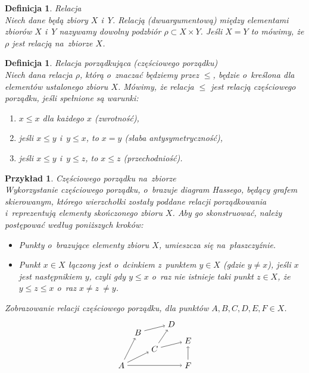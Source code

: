 \documentclass[12pt,a4paper]{report}
\newtheorem{definition}[theorem]{Definicja}
\newtheorem{example}{Przykład}
\begin{document}
\begin{definition}{Relacja \cite[Rozdział 3]{kuratowski2004}}\\
Niech dane będą zbiory $X$ i~$Y$. Relacją (dwuargumentową) między elementami zbiorów $X$ i~$Y$ nazywamy dowolny podzbiór $\rho \subset X \times Y $. Jeśli $X=Y$ to mówimy, że $\rho$ jest relacją na~zbiorze $X$. 
\end{definition} 


\begin{definition}{Relacja porządkująca (częściowego porządku) \cite[Rozdział 2]{blaszczyk2007}}\label{def-relacja-czesciowego-porzadku}\\
Niech dana relacja $\rho$, którą o~znaczać będziemy przez $\leq$, będzie o~kreślona dla elementów ustalonego zbioru $X$. Mówimy, że relacja $\leq$ jest relacją częściowego porządku, jeśli spełnione są warunki:
\begin{enumerate}
\item $x \leq x$ dla każdego $x$ (zwrotność),
\item jeśli $x \leq y$ i~$y \leq x$, to $x=y$ (słaba antysymetryczność),
\item jeśli $x \leq y$ i~$y \leq z$, to $x \leq z$ (przechodniość).
\end{enumerate}
\end{definition}


\begin{example}{Częściowego porządku na~zbiorze}\label{przyklad-czesciowy-porzadek}\\
Wykorzystanie częściowego porządku, o~brazuje diagram Hassego, będący grafem skierowanym, którego wierzchołki zostały poddane relacji porządkowania i~reprezentują elementy  skończonego zbioru $X$. 
Aby go skonstruować, należy postępować według poniższych kroków:
\begin{itemize}
\item Punkty o~brazujące elementy zbioru $X$, umieszcza się na~płaszczyźnie.
\item Punkt $x\in X$ łączony jest o~dcinkiem z~punktem $y \in X$ (gdzie $y\neq x$), jeśli $x$ jest następnikiem $y$, czyli gdy $y \leq x$ o~raz nie istnieje taki punkt $z \in X$, że $y\leq z\leq x$ o~raz $x\neq z~\neq y$.
\end{itemize}
Zobrazowanie relacji częściowego porządku, dla punktów $A, B, C, D, E, F \in X$.
$$
\begin{tikzpicture}[scale=.7]
  \node (A) at (-1,0) {$A$};
  \node (B) at (0,2) {$B$};
  \node (C) at (1,1) {$C$};
 \node (E) at (3,1.5) {$E$};
 \node (F) at (3,0) {$F$};
 \node (D) at (2,2.5) {$D$};
 \draw [->](A) --(C);
 \draw [->](A) --(B);
 \draw [->](B) --(D);
 \draw [->](C) --(D);
 \draw [->](C) --(E);
 \draw [->](A) --(F);
 \draw [->](F) --(E);
 
\end{tikzpicture}
$$
\end{example}
\end{document}
